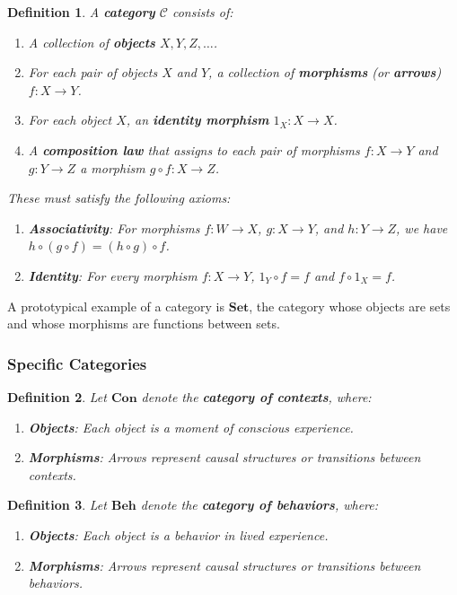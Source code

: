 \documentclass{article}
\newtheorem{definition}{Definition}[section]
\begin{document}
\begin{definition}
    A \textbf{category} $\mathcal{C}$ consists of:
    \begin{enumerate}[label=(\alph*)]
        \item A collection of \textbf{objects} $X, Y, Z, \dots$.
        \item For each pair of objects $X$ and $Y$, a collection of \textbf{morphisms} (or \textbf{arrows}) $f \colon X \to Y$.
        \item For each object $X$, an \textbf{identity morphism} $1_X \colon X \to X$.
        \item A \textbf{composition law} that assigns to each pair of morphisms $f \colon X \to Y$ and $g \colon Y \to Z$ a morphism $g \circ f \colon X \to Z$.
    \end{enumerate}
    These must satisfy the following axioms:
    \begin{enumerate}
        \item \textbf{Associativity}: For morphisms $f \colon W \to X$, $g \colon X \to Y$, and $h \colon Y \to Z$, we have $h \circ (g \circ f) = (h \circ g) \circ f$.
        \item \textbf{Identity}: For every morphism $f \colon X \to Y$, $1_Y \circ f = f$ and $f \circ 1_X = f$.
    \end{enumerate}
\end{definition}

A prototypical example of a category is $\mathbf{Set}$, the category whose objects are sets and whose morphisms are functions between sets.

\subsubsection{Specific Categories}

\begin{definition}
    Let $\mathbf{Con}$ denote the \textbf{category of contexts}, where:
    \begin{enumerate}
        \item \textbf{Objects}: Each object is a moment of conscious experience.
        \item \textbf{Morphisms}: Arrows represent causal structures or transitions between contexts.
    \end{enumerate}
\end{definition}

\begin{definition}
    Let $\mathbf{Beh}$ denote the \textbf{category of behaviors}, where:
    \begin{enumerate}
        \item \textbf{Objects}: Each object is a behavior in lived experience.
        \item \textbf{Morphisms}: Arrows represent causal structures or transitions between behaviors.
    \end{enumerate}
\end{definition}
\end{document}
